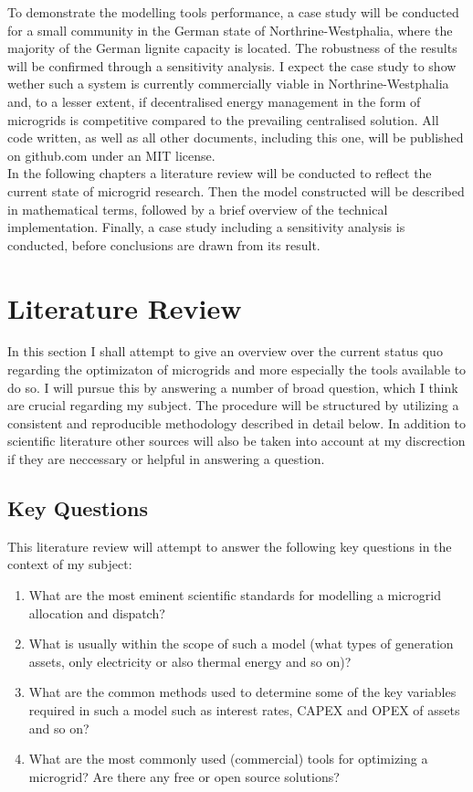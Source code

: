\documentclass[
	11pt,								%
	DIV10,								%
	a4paper,         					%
	oneside,							%
	headheight=20pt,					%
	footheight=20pt,					%
    parskip=full,						%
    listof=totoc,						%
	bibliography=totoc,					%
	index=totoc,						%
]{scrartcl}
\begin{document}
To demonstrate the modelling tools performance, a case study will be conducted for a small community in the German state of Northrine-Westphalia, where the majority of the German lignite capacity is located. The robustness of the results will be confirmed through a sensitivity analysis.
I expect the case study to show wether such a system is currently commercially viable in Northrine-Westphalia and, to a lesser extent, if decentralised energy management in the form of microgrids is competitive compared to the prevailing centralised solution.
All code written, as well as all other documents, including this one, will be published on github.com  under an MIT license.
\\
In the following chapters a literature review will be conducted to reflect the current state of microgrid research. Then the model constructed will be described in mathematical terms, followed by a brief overview of the technical implementation. Finally, a case study including a sensitivity analysis is conducted, before conclusions are drawn from its result.

\newpage
{}	

\section{Literature Review}
In this section I shall attempt to give an overview over the current status quo regarding the optimizaton of microgrids and more especially the tools available to do so. I will pursue  this by answering a number of broad question, which I think are crucial regarding my subject. The procedure will be structured by utilizing a consistent and reproducible methodology described in detail below. In addition to scientific literature other sources will also be taken into account at my discrection if they are neccessary or helpful in answering a question.

\subsection{Key Questions}
This literature review will attempt to answer the following key questions in the context of my subject:
\begin{enumerate}
	\item What are the most eminent scientific standards for modelling a microgrid allocation and dispatch?
	\item What is usually within the scope of such a model (what types of generation assets, only electricity or also thermal energy and so on)? 
	\item What are the common methods used to determine some of the key variables required in such a model such as interest rates, CAPEX and OPEX of assets and so on?
	\item What are the most commonly used (commercial) tools for optimizing a microgrid? Are there any free or open source solutions? 
\end{enumerate} 
\end{document}
